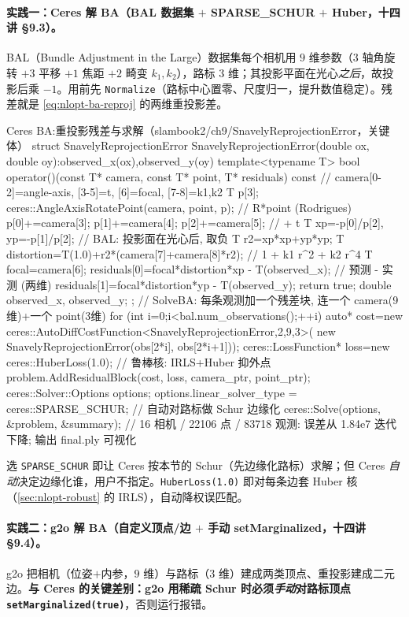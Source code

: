 \paragraph{实践一：Ceres 解 BA（BAL 数据集 $+$ SPARSE\_SCHUR $+$ Huber，十四讲 §9.3）。}\cite{gaoxiang2019slam14}
BAL（Bundle Adjustment in the Large）数据集每个相机用 $9$ 维参数（$3$ 轴角旋转 $+3$ 平移 $+1$ 焦距 $+2$ 畸变 $k_1,k_2$），路标 $3$ 维；其投影平面在光心\emph{之后}，故投影后乘 $-1$。用前先 \texttt{Normalize}（路标中心置零、尺度归一，提升数值稳定）。残差就是 \cref{eq:nlopt-ba-reproj} 的两维重投影差。

\begin{codebox}[C++]{Ceres BA:重投影残差与求解（slambook2/ch9/SnavelyReprojectionError，关键体）}
struct SnavelyReprojectionError {
  SnavelyReprojectionError(double ox, double oy):observed_x(ox),observed_y(oy){}
  template<typename T>
  bool operator()(const T* camera, const T* point, T* residuals) const {
    // camera[0-2]=angle-axis, [3-5]=t, [6]=focal, [7-8]=k1,k2
    T p[3];
    ceres::AngleAxisRotatePoint(camera, point, p);      // R*point  (Rodrigues)
    p[0]+=camera[3]; p[1]+=camera[4]; p[2]+=camera[5];  // + t
    T xp=-p[0]/p[2], yp=-p[1]/p[2];                     // BAL: 投影面在光心后, 取负
    T r2=xp*xp+yp*yp;
    T distortion=T(1.0)+r2*(camera[7]+camera[8]*r2);    // 1 + k1 r^2 + k2 r^4
    T focal=camera[6];
    residuals[0]=focal*distortion*xp - T(observed_x);   // 预测 - 实测 (两维)
    residuals[1]=focal*distortion*yp - T(observed_y);
    return true;
  }
  double observed_x, observed_y;
};
// SolveBA: 每条观测加一个残差块, 连一个 camera(9维)+一个 point(3维)
for (int i=0;i<bal.num_observations();++i){
  auto* cost=new ceres::AutoDiffCostFunction<SnavelyReprojectionError,2,9,3>(
               new SnavelyReprojectionError(obs[2*i], obs[2*i+1]));
  ceres::LossFunction* loss=new ceres::HuberLoss(1.0); // 鲁棒核: IRLS+Huber 抑外点
  problem.AddResidualBlock(cost, loss, camera_ptr, point_ptr);
}
ceres::Solver::Options options;
options.linear_solver_type = ceres::SPARSE_SCHUR;  // 自动对路标做 Schur 边缘化
ceres::Solve(options, &problem, &summary);
// 16 相机 / 22106 点 / 83718 观测: 误差从 1.84e7 迭代下降; 输出 final.ply 可视化
\end{codebox}

\noindent 选 \texttt{SPARSE\_SCHUR} 即让 Ceres 按本节的 Schur（先边缘化路标）求解；但 Ceres \emph{自动}决定边缘化谁，用户不指定。\texttt{HuberLoss(1.0)} 即对每条边套 Huber 核（\cref{sec:nlopt-robust} 的 IRLS），自动降权误匹配。

\paragraph{实践二：g2o 解 BA（自定义顶点/边 $+$ 手动 setMarginalized，十四讲 §9.4）。}\cite{gaoxiang2019slam14}
g2o 把相机（位姿$+$内参，$9$ 维）与路标（$3$ 维）建成两类顶点、重投影建成二元边。\textbf{与 Ceres 的关键差别：g2o 用稀疏 Schur 时必须\emph{手动}对路标顶点 \texttt{setMarginalized(true)}}，否则运行报错。

